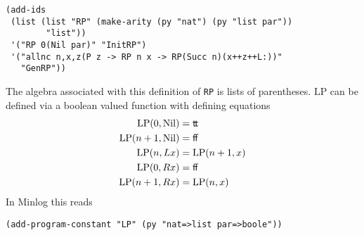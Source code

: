 \documentclass[12pt]{amsart}
\newcommand{\nil}{\mathrm{Nil}}
\newcommand{\false}{\mathsf{f\kern-0.14em f}}
\newcommand{\true}{\mathsf{t\kern-0.14em t}}
\begin{document}
\begin{appendix}
\begin{verbatim}
(add-ids
 (list (list "RP" (make-arity (py "nat") (py "list par"))
        "list"))
 '("RP 0(Nil par)" "InitRP")
 '("allnc n,x,z(P z -> RP n x -> RP(Succ n)(x++z++L:))"
   "GenRP"))
\end{verbatim}
The algebra associated with this definition of \verb|RP| is lists of
parentheses.  $\mathrm{LP}$ can be defined via a boolean valued
function with defining equations
\begin{align*}
  \mathrm{LP}(0,\nil) &= \true
  \\
  \mathrm{LP}(n+1,\nil) &= \false
  \\
  \mathrm{LP}(n,Lx) &= \mathrm{LP}(n+1,x)
  \\
  \mathrm{LP}(0,Rx) &= \false
  \\
  \mathrm{LP}(n+1,Rx) &= \mathrm{LP}(n,x)
\end{align*}
In Minlog this reads
\begin{verbatim}
(add-program-constant "LP" (py "nat=>list par=>boole"))


\end{verbatim}
\end{appendix}
\end{document}
